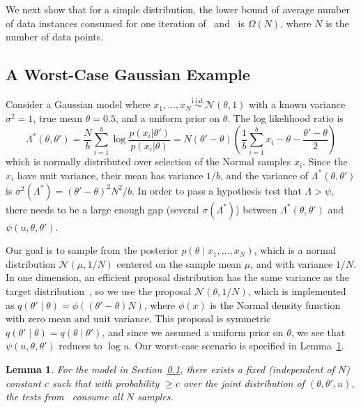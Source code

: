 \documentclass{article}
\newcommand{\simiid}{\overset{\textrm{i.i.d.}}{\sim}}
\newtheorem{lemma}{Lemma}
\begin{document}
We next show that for a simple distribution, the lower bound of average
number of data instances consumed for one iteration of~\cite{cutting_mh_2014}
and~\cite{icml2014c1_bardenet14} is $\Omega(N)$, where $N$ is the number of data
points.

\subsection{A Worst-Case Gaussian Example}\label{ssec:gaussian_example}
Consider a Gaussian model where $x_1,\ldots,x_N \simiid \mathcal{N}(\theta,1)$
with a known variance $\sigma^2=1$, true mean $\theta=0.5$, and a uniform prior
on $\theta$. The log likelihood ratio is
\begin{equation}\label{eq:lemma_ll_ratio}
\Lambda^*(\theta,\theta') =  \frac{N}{b}\sum_{i=1}^b \log\frac{p(x_i|\theta')}{p(x_i|\theta)}=
  N(\theta'-\theta)\left(\frac{1}{b}\sum_{i=1}^b x_i-\theta-\frac{\theta'-\theta}{2}\right)
\end{equation}
which is normally distributed over selection of the Normal samples $x_i$.  Since
the $x_i$ have unit variance, their mean has variance $1/b$, and the variance of
$\Lambda^*(\theta,\theta')$ is $\sigma^2(\Lambda^*) = (\theta'-\theta)^2N^2/b$.
In order to pass a hypothesis test that $\Lambda > \psi$, there needs to be a
large enough gap (several $\sigma(\Lambda^*)$) between
$\Lambda^*(\theta,\theta')$ and $\psi(u,\theta,\theta')$. 

Our goal is to sample from the posterior $p(\theta \mid x_1,\ldots,x_N)$, which
is a normal distribution $\mathcal{N}(\mu, 1/N)$ centered on the sample mean
$\mu$, and with variance $1/N$. In one dimension, an efficient proposal
distribution has the same variance as the target
distribution~\cite{OptimalScaling01}, so we use the proposal
$\mathcal{N}(\theta,1/N)$, which is implemented as
$q(\theta'\mid\theta)=\phi((\theta'-\theta)N)$, where $\phi(x)$ is the Normal
density function with zero mean and unit variance. This proposal is symmetric
$q(\theta'\mid\theta)=q(\theta\mid\theta')$, and since we assumed a uniform
prior on $\theta$, we see that $\psi(u,\theta,\theta')$ reduces to $\log u$. Our
worst-case scenario is specified in Lemma~\ref{lem:worst_case}.

\begin{lemma}\label{lem:worst_case}
    For the model in Section~\ref{ssec:gaussian_example}, there exists a fixed
    (independent of $N$) constant $c$ such that with probability $\geq c$ over
    the joint distribution of $(\theta, \theta', u)$, the tests
    from~\cite{cutting_mh_2014,icml2014c1_bardenet14} consume all $N$ samples. 
\end{lemma}
\end{document}
